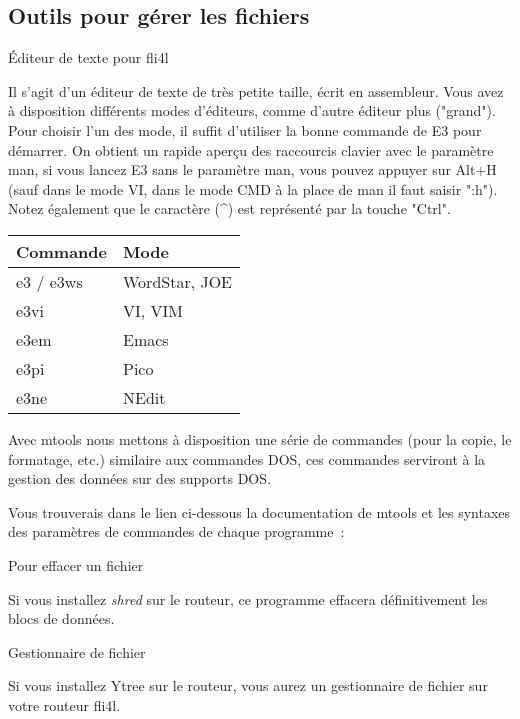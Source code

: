 \subsection{Outils pour gérer les fichiers}

\begin{description}

 Éditeur de texte pour fli4l

    Il s'agit d'un éditeur de texte de très petite taille, écrit en assembleur.
    Vous avez à disposition différents modes d'éditeurs, comme d'autre éditeur
    plus ("grand"). Pour choisir l'un des mode, il suffit d'utiliser la bonne
    commande de E3 pour démarrer. On obtient un rapide aperçu des raccourcis
    clavier avec le paramètre man, si vous lancez E3 sans le paramètre man,
    vous pouvez appuyer sur Alt+H (sauf dans le mode VI, dans le mode CMD à la
    place de man il faut saisir ":h"). Notez également que le caractère (\^{ })
    est représenté par la touche "Ctrl".

    \begin{tabular}{ll}
      Commande & Mode \\
      \hline
      e3 / e3ws & WordStar, JOE \\
      e3vi      & VI, VIM \\
      e3em      & Emacs \\
      e3pi      & Pico \\
      e3ne      & NEdit
    \end{tabular}


    Avec mtools nous mettons à disposition une série de commandes (pour la
    copie, le formatage, etc.) similaire aux commandes DOS, ces commandes
    serviront à la gestion des données sur des supports DOS.

    Vous trouverais dans le lien ci-dessous la documentation de mtools et les
    syntaxes des paramètres de commandes de chaque programme~:\\

 Pour effacer un fichier

    Si vous installez \emph{shred} sur le routeur, ce programme effacera
    définitivement les blocs de données.

 Gestionnaire de fichier

    Si vous installez Ytree sur le routeur, vous aurez un gestionnaire de
    fichier sur votre routeur fli4l.

\end{description}

